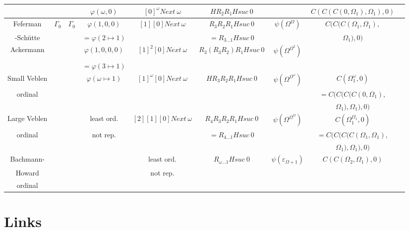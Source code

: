 \documentclass[10pt]{article}
\begin{document}
\begin{tabular}{|c|c|c|c|c|c|c|c|c|}
		&			&			& \(\varphi(\omega,0)\)		& \([0]^\omega Next\ \omega\) & \(H R_2 R_1 H suc\ 0\)&					& \(C(C(C(0,\Omega_1),\Omega_1),0)\) \\ \hline
Feferman	& \(\Gamma_0\)		
								& \(\Gamma_0\)			& \(\varphi(1,0,0)\)		& \([1] [0] Next\ \omega\)	& \(R_3 R_2 R_1 H suc\ 0\) & \(\psi(\Omega^\Omega)\)		& \(C(C(C(\Omega_1,\Omega_1),\) \\ 
-Schütte	&			&				& \(=\varphi(2 \mapsto 1)\)	&				& \(= R_{3 \ldots 1} H suc\ 0\) & 					& \(\Omega_1),0)\)		\\ \hline
Ackermann	&			&				& \(\varphi(1,0,0,0)\)		& \([1]^2 [0] Next\ \omega\) & \(R_3 (R_3 R_2) R_1 H suc\ 0\) & \(\psi(\Omega^{\Omega^2})\)		&				\\ 
		&			&				& \(=\varphi(3 \mapsto 1)\)	&				&			&					&				\\ \hline
Small Veblen	&			&				& \(\varphi(\omega \mapsto 1)\)	& \([1]^\omega [0] Next\ \omega\) & \(H R_3 R_2 R_1 H suc\ 0\) & \(\psi(\Omega^{\Omega^\omega})\)	& \(C(\Omega_1^\omega,0)\)	\\
ordinal		&			&				&				&				&			&					& \(=C(C(C(C(0,\Omega_1), \)	\\ 
		&			&				&				&				&			&					& \(\Omega_1),\Omega_1),0)\)	\\ \hline
Large Veblen	&			&				& least ord.	 	 	& \([2] [1] [0] Next\ \omega\)	& \(R_4 R_3 R_2 R_1 H suc\ 0\) & \(\psi(\Omega^{\Omega^\Omega})\)	& \(C(\Omega_1^{\Omega_1},0)\)	\\
ordinal		&			&				& not rep.			&				& \(= R_{4 \ldots 1} H suc\ 0\) &					& \(=C(C(C(C(\Omega_1,\Omega_1),\) \\ 
		&			&				&				&				&			&					& \( \Omega_1),\Omega_1),0) \)	\\ \hline
Bachmann-	&			&				&				& least ord.			& \(R_{\omega \ldots 1} H suc\ 0\) & \(\psi(\varepsilon_{\Omega+1})\)	& \(C(C(\Omega_2,\Omega_1),0)\)	\\
Howard		&			&				&				& not rep.			&			&					&				\\ 
ordinal		&			&				&				&				&			&					&				\\ \hline
  
\end{tabular}

\section{Links}
\end{document}

